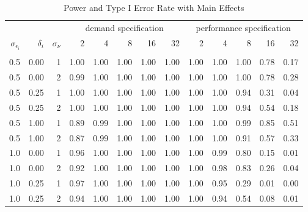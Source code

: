 \begin{table}

\caption{\label{tab:big-main-table}Power and Type I Error Rate with Main Effects}
\centering
\fontsize{9}{11}\selectfont
\begin{threeparttable}
\begin{tabular}[t]{rrrrrrrrrrrrr}
\toprule
\multicolumn{3}{c}{ } & \multicolumn{5}{c}{demand specification} & \multicolumn{5}{c}{performance specification} \\
\cmidrule(l{3pt}r{3pt}){4-8} \cmidrule(l{3pt}r{3pt}){9-13}
$\sigma_{\epsilon_i}$ & $\delta_i$ & $\sigma_{\nu}$ & 2 & 4 & 8 & 16 & 32 & 2 & 4 & 8 & 16 & 32\\
\midrule
\addlinespace[0.3em]
\multicolumn{13}{c}{\textbf{Power}}\\
\hspace{1em}0.5 & 0.00 & 1 & 1.00 & 1.00 & 1.00 & 1.00 & 1.00 & 1.00 & 1.00 & 1.00 & 0.78 & 0.17\\
\hspace{1em}0.5 & 0.00 & 2 & 0.99 & 1.00 & 1.00 & 1.00 & 1.00 & 1.00 & 1.00 & 1.00 & 0.78 & 0.28\\
\hspace{1em}0.5 & 0.25 & 1 & 1.00 & 1.00 & 1.00 & 1.00 & 1.00 & 1.00 & 1.00 & 0.94 & 0.31 & 0.04\\
\hspace{1em}0.5 & 0.25 & 2 & 1.00 & 1.00 & 1.00 & 1.00 & 1.00 & 1.00 & 1.00 & 0.94 & 0.54 & 0.18\\
\hspace{1em}0.5 & 1.00 & 1 & 0.89 & 0.99 & 1.00 & 1.00 & 1.00 & 1.00 & 1.00 & 0.99 & 0.85 & 0.51\\
\hspace{1em}0.5 & 1.00 & 2 & 0.87 & 0.99 & 1.00 & 1.00 & 1.00 & 1.00 & 1.00 & 0.91 & 0.57 & 0.33\\
\hspace{1em}1.0 & 0.00 & 1 & 0.96 & 1.00 & 1.00 & 1.00 & 1.00 & 1.00 & 0.99 & 0.80 & 0.15 & 0.01\\
\hspace{1em}1.0 & 0.00 & 2 & 0.92 & 1.00 & 1.00 & 1.00 & 1.00 & 1.00 & 0.98 & 0.83 & 0.26 & 0.04\\
\hspace{1em}1.0 & 0.25 & 1 & 0.97 & 1.00 & 1.00 & 1.00 & 1.00 & 1.00 & 0.95 & 0.29 & 0.01 & 0.00\\
\hspace{1em}1.0 & 0.25 & 2 & 0.94 & 1.00 & 1.00 & 1.00 & 1.00 & 1.00 & 0.94 & 0.54 & 0.08 & 0.01\\

\end{tabular}
\end{threeparttable}
\end{table}
